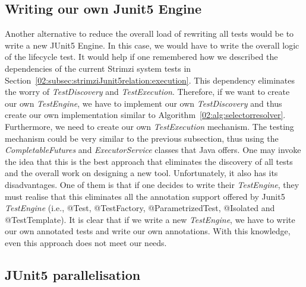 \subsection{Writing our own Junit5 Engine}

Another alternative to reduce the overall load of rewriting all tests would be to write a new JUnit5 Engine.
In this case, we would have to write the overall logic of the lifecycle test.
It would help if one remembered how we described the dependencies of the current Strimzi system tests in Section~\ref{02:subsec:strimziJunit5relation:execution}.
This dependency eliminates the worry of \emph{TestDiscovery} and \emph{TestExecution}.
Therefore, if we want to create our own \emph{TestEngine}, we have to implement our own \emph{TestDiscovery} and thus create our own implementation similar to Algorithm~\ref{02:alg:selectorresolver}.
Furthermore, we need to create our own \emph{TestExecution} mechanism.
The testing mechanism could be very similar to the previous subsection, thus using the \emph{CompletableFutures} and \emph{ExecutorService} classes that Java offers.
One may invoke the idea that this is the best approach that eliminates the discovery of all tests and the overall work on designing a new tool.
Unfortunately, it also has its disadvantages.
One of them is that if one decides to write their \emph{TestEngine}, they must realise that this eliminates all the annotation support offered by Junit5 \emph{TestEngine} (i.e., @Test, @TestFactory, @ParametrizedTest, @Isolated and @TestTemplate).
It is clear that if we write a new \emph{TestEngine}, we have to write our own annotated tests and write our own annotations.
With this knowledge, even this approach does not meet our needs.


\subsection{JUnit5 parallelisation}

